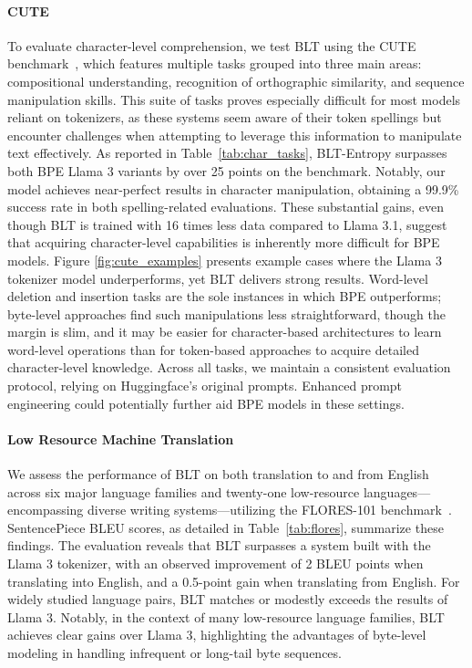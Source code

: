 \paragraph{CUTE}
To evaluate character-level comprehension, we test {\textsc BLT} using the CUTE benchmark~\citep{edman2024cute}, which features multiple tasks grouped into three main areas: compositional understanding, recognition of orthographic similarity, and sequence manipulation skills. This suite of tasks proves especially difficult for most models reliant on tokenizers, as these systems seem aware of their token spellings but encounter challenges when attempting to leverage this information to manipulate text effectively. As reported in Table~\ref{tab:char_tasks}, {\textsc BLT}-Entropy surpasses both BPE Llama 3 variants by over 25 points on the benchmark. Notably, our model achieves near-perfect results in character manipulation, obtaining a 99.9\% success rate in both spelling-related evaluations. These substantial gains, even though {\textsc BLT} is trained with 16 times less data compared to Llama 3.1, suggest that acquiring character-level capabilities is inherently more difficult for BPE models. Figure \ref{fig:cute_examples} presents example cases where the Llama 3 tokenizer model underperforms, yet {\textsc BLT} delivers strong results. Word-level deletion and insertion tasks are the sole instances in which BPE outperforms; byte-level approaches find such manipulations less straightforward, though the margin is slim, and it may be easier for character-based architectures to learn word-level operations than for token-based approaches to acquire detailed character-level knowledge. Across all tasks, we maintain a consistent evaluation protocol, relying on Huggingface's original prompts. Enhanced prompt engineering could potentially further aid BPE models in these settings.

\paragraph{Low Resource Machine Translation} We assess the performance of {\textsc BLT} on both translation to and from English across six major language families and twenty-one low-resource languages—encompassing diverse writing systems—utilizing the FLORES-101 benchmark~\citep{goyal2022flores}. SentencePiece BLEU scores, as detailed in Table~\ref{tab:flores}, summarize these findings. The evaluation reveals that {\textsc BLT} surpasses a system built with the Llama 3 tokenizer, with an observed improvement of 2 BLEU points when translating into English, and a 0.5-point gain when translating from English. For widely studied language pairs, {\textsc BLT} matches or modestly exceeds the results of Llama 3. Notably, in the context of many low-resource language families, {\textsc BLT} achieves clear gains over Llama 3, highlighting the advantages of byte-level modeling in handling infrequent or long-tail byte sequences.

